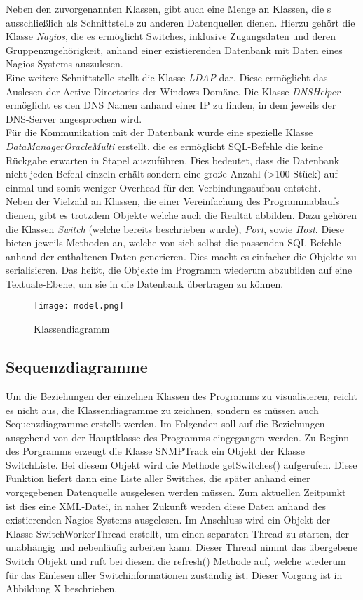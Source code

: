 Neben den zuvorgenannten Klassen, gibt auch eine Menge an Klassen, die s ausschließlich als Schnittstelle zu anderen Datenquellen dienen.
Hierzu gehört die Klasse \textit{Nagios}, die es ermöglicht Switches, inklusive Zugangsdaten und deren Gruppenzugehörigkeit, anhand einer existierenden Datenbank mit Daten eines Nagios-Systems auszulesen.\\
Eine weitere Schnittstelle stellt die Klasse \textit{LDAP} dar. Diese ermöglicht das Auslesen der Active-Directories der Windows Domäne.
Die Klasse \textit{DNSHelper} ermöglicht es den DNS Namen anhand einer IP zu finden, in dem jeweils der DNS-Server angesprochen wird.\\
Für die Kommunikation mit der Datenbank wurde eine spezielle Klasse \textit{DataManagerOracleMulti} erstellt, die es ermöglicht SQL-Befehle die keine Rückgabe erwarten in Stapel auszuführen.
Dies bedeutet, dass die Datenbank nicht jeden Befehl einzeln erhält sondern eine große Anzahl (>100 Stück) auf einmal und somit weniger Overhead für den Verbindungsaufbau entsteht.\\
Neben der Vielzahl an Klassen, die einer Vereinfachung des Programmablaufs dienen, gibt es trotzdem Objekte welche auch die Realtät abbilden.
Dazu gehören die Klassen \textit{Switch} (welche bereits beschrieben wurde), \textit{Port}, sowie \textit{Host}.
Diese bieten jeweils Methoden an, welche von sich selbst die passenden SQL-Befehle anhand der enthaltenen Daten generieren. Dies macht es einfacher die Objekte zu serialisieren.
Das heißt, die Objekte im Programm wiederum abzubilden auf eine Textuale-Ebene, um sie in die Datenbank übertragen zu können.\\

\begin{figure}[H]
\centering
\texttt{[image: model.png]}
\caption{Klassendiagramm}
\label{fig:classdiagram}
\end{figure}

\subsection{Sequenzdiagramme}
\label{subsec:seqdiagrams}

Um die Beziehungen der einzelnen Klassen des Programms zu visualisieren, reicht es nicht aus, die Klassendiagramme zu zeichnen, sondern es müssen auch Sequenzdiagramme erstellt werden.
Im Folgenden soll auf die Beziehungen ausgehend von der Hauptklasse des Programms eingegangen werden.
Zu Beginn des Porgramms erzeugt die Klasse SNMPTrack ein Objekt der Klasse SwitchListe.
Bei diesem Objekt wird die Methode getSwitches() aufgerufen.
Diese Funktion liefert dann eine Liste aller Switches, die später anhand einer vorgegebenen Datenquelle ausgelesen werden müssen.
Zum aktuellen Zeitpunkt ist dies eine XML-Datei, in naher Zukunft werden diese Daten anhand des existierenden Nagios Systems ausgelesen. Im Anschluss wird ein Objekt der Klasse SwitchWorkerThread erstellt, um einen separaten Thread zu starten, der unabhängig und nebenläufig arbeiten kann. Dieser Thread nimmt das übergebene Switch Objekt und ruft bei diesem die refresh() Methode auf, welche wiederum für das Einlesen aller Switchinformationen zuständig ist. Dieser Vorgang ist in Abbildung X beschrieben.


